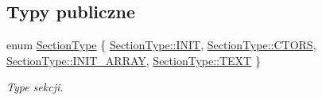\subsection*{Typy publiczne}
\begin{DoxyCompactItemize}
\item 
enum \hyperlink{class_e_l_f_abaebdfb7048441e430684d68df8d73d1}{Section\-Type} \{ \hyperlink{class_e_l_f_abaebdfb7048441e430684d68df8d73d1afaee4ca3c30ee18148ce3ada37466498}{Section\-Type\-::\-I\-N\-I\-T}, 
\hyperlink{class_e_l_f_abaebdfb7048441e430684d68df8d73d1a02f11aadd3ab1bd5b7ccd3040d8a0075}{Section\-Type\-::\-C\-T\-O\-R\-S}, 
\hyperlink{class_e_l_f_abaebdfb7048441e430684d68df8d73d1a8c11d1b1290b76379bf90434c0e83f4a}{Section\-Type\-::\-I\-N\-I\-T\-\_\-\-A\-R\-R\-A\-Y}, 
\hyperlink{class_e_l_f_abaebdfb7048441e430684d68df8d73d1a61a96ffcb251bb9bf0abf8fec19d0ea8}{Section\-Type\-::\-T\-E\-X\-T}
 \}
\begin{DoxyCompactList}\small\item\em Type sekcji. \end{DoxyCompactList}\end{DoxyCompactItemize}
